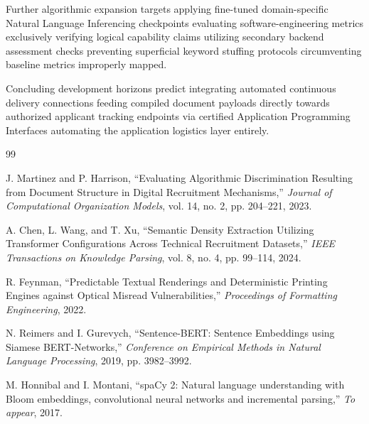 \documentclass[12pt,a4paper]{report}
\begin{document}
Further algorithmic expansion targets applying fine-tuned domain-specific Natural Language Inferencing checkpoints evaluating software-engineering metrics exclusively verifying logical capability claims utilizing secondary backend assessment checks preventing superficial keyword stuffing protocols circumventing baseline metrics improperly mapped. 

Concluding development horizons predict integrating automated continuous delivery connections feeding compiled document payloads directly towards authorized applicant tracking endpoints via certified Application Programming Interfaces automating the application logistics layer entirely. 

\renewcommand{\bibname}{References}
\begin{thebibliography}{99}

J. Martinez and P. Harrison, ``Evaluating Algorithmic Discrimination Resulting from Document Structure in Digital Recruitment Mechanisms,'' \textit{Journal of Computational Organization Models}, vol. 14, no. 2, pp. 204--221, 2023.

A. Chen, L. Wang, and T. Xu, ``Semantic Density Extraction Utilizing Transformer Configurations Across Technical Recruitment Datasets,'' \textit{IEEE Transactions on Knowledge Parsing}, vol. 8, no. 4, pp. 99--114, 2024.

R. Feynman, ``Predictable Textual Renderings and Deterministic Printing Engines against Optical Misread Vulnerabilities,'' \textit{Proceedings of Formatting Engineering}, 2022.

N. Reimers and I. Gurevych, ``Sentence-BERT: Sentence Embeddings using Siamese BERT-Networks,'' \textit{Conference on Empirical Methods in Natural Language Processing}, 2019, pp. 3982--3992.

M. Honnibal and I. Montani, ``spaCy 2: Natural language understanding with Bloom embeddings, convolutional neural networks and incremental parsing,'' \textit{To appear}, 2017.

\end{thebibliography}
\end{document}
